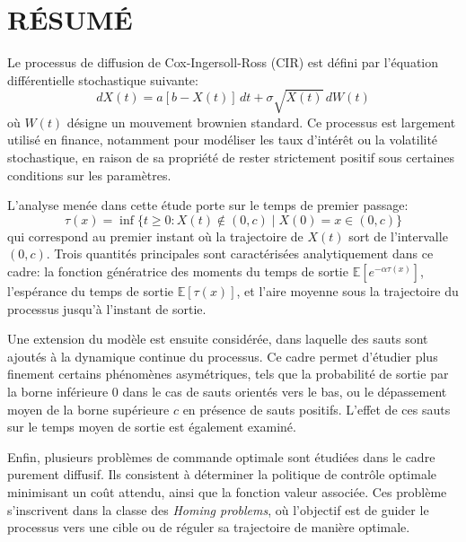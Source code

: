 %
\chapter*{RÉSUMÉ}\thispagestyle{headings}

Le processus de diffusion de Cox-Ingersoll-Ross (CIR) est défini par l'équation différentielle stochastique suivante:
\[
dX(t) = a[b - X(t)]\,dt + \sigma \sqrt{X(t)}\,dW(t)
\]
où \(W(t)\) désigne un mouvement brownien standard. Ce processus est largement utilisé en finance, notamment pour modéliser les taux d'intérêt ou la volatilité stochastique, en raison de sa propriété de rester strictement positif sous certaines conditions sur les paramètres.

L'analyse menée dans cette étude porte sur le temps de premier passage:
\[
\tau(x) = \inf\{ t \geq 0 : X(t) \notin (0, c) \mid X(0) = x \in (0, c) \}
\]
qui correspond au premier instant où la trajectoire de \(X(t)\) sort de l'intervalle \((0,c)\). Trois quantités principales sont caractérisées analytiquement dans ce cadre: la fonction génératrice des moments du temps de sortie \( \mathds{E}[e^{-\alpha \tau(x)}] \), l'espérance du temps de sortie \( \mathds{E}[\tau(x)] \), et l'aire moyenne sous la trajectoire du processus jusqu'à l'instant de sortie.

Une extension du modèle est ensuite considérée, dans laquelle des sauts sont ajoutés à la dynamique continue du processus. Ce cadre permet d'étudier plus finement certains phénomènes asymétriques, tels que la probabilité de sortie par la borne inférieure \(0\) dans le cas de sauts orientés vers le bas, ou le dépassement moyen de la borne supérieure \(c\) en présence de sauts positifs. L'effet de ces sauts sur le temps moyen de sortie est également examiné.

Enfin, plusieurs problèmes de commande optimale sont étudiées dans le cadre purement diffusif. Ils consistent à déterminer la politique de contrôle optimale minimisant un coût attendu, ainsi que la fonction valeur associée. Ces problème s'inscrivent dans la classe des \textit{Homing problems}, où l'objectif est de guider le processus vers une cible ou de réguler sa trajectoire de manière optimale.